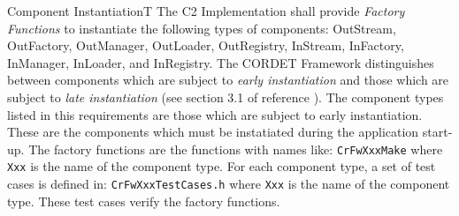 \documentclass{pnp_article}
\begin{document}
\begin{fwReq}{Component Instantiation}{T}
{The C2 Implementation shall provide \textit{Factory Functions} to instantiate the following types of components: OutStream, OutFactory, OutManager, OutLoader, OutRegistry, InStream, InFactory, InManager, InLoader, and InRegistry.}
{The CORDET Framework distinguishes between components which are subject to \textit{early instantiation} and those which are subject to \textit{late instantiation} (see section 3.1 of reference \cite{ref:cordetfw}). The component types listed in this requirements are those which are subject to early instantiation. These are the components which must be instatiated during the application start-up.}
{The factory functions are the functions with names like: \texttt{CrFwXxxMake} where \texttt{Xxx} is the name of the component type. } 
{For each component type, a set of test cases is defined in: \texttt{CrFwXxxTestCases.h} where \texttt{Xxx} is the name of the component type. These test cases verify the factory functions.}
\end{fwReq}
\end{document}
